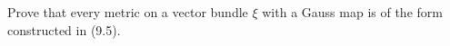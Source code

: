 Prove that every metric on a vector bundle $\xi$ with a Gauss map is of the form constructed in (9.5).